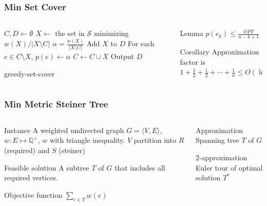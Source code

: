 \documentclass[12pt,aspectratio=169]{beamer}
\begin{document}
\begin{frame}\frametitle{Min Set Cover }
\begin{columns} 
  \begin{column}{0.61\textwidth}
\begin{algorithm}[H]
  $C, D\gets \emptyset$\;
{
  $X\gets$ the set in $\mathcal{S}$ minimizing $w(X)/|X\setminus C|$\;
  $\alpha = \frac{w(X)}{|X\setminus C|}$\;
  Add $X$ to $D$\;
  For each $e\in C\setminus X$, $p(e)\gets \alpha$\;
  $C\gets C\cup X$
}
Output $D$
\caption{greedy-set-cover}
\end{algorithm}
\end{column}
  \begin{column}{0.34\textwidth}
\begin{block}{Lemma}
    $p(e_{k}) \le \frac{OPT}{n-k+1}$
  \end{block}
  \begin{block}{Corollary}
    Approximation factor is $1 + \frac{1}{2} + \frac{1}{2} + \cdots + \frac{1}{n} \le
    O(\log n)$
  \end{block}
\end{column}
\end{columns}
\end{frame}

\begin{frame}\frametitle{Min Metric Steiner Tree}
\begin{columns} 
  \begin{column}{0.48\textwidth}
  \begin{block}{Instance}
    A weighted undirected graph $G=\langle V,E \rangle$, $w:E\mapsto \mathbb{Q}^{+}$, $w$
    with triangle inequality.
%
    $V$ partition into $R$ (required) and $S$ (steiner)
  \end{block}
  \begin{block}{Feasible solution}
    A subtree $T$ of $G$ that includes all required vertices.
%
  \end{block}
  \begin{block}{Objective function}
    $\sum_{e\in T}w(e)$
  \end{block}
\end{column}
    \begin{column}{0.48\textwidth}
      \begin{block}{Approximation}
        Spanning tree $T$ of $G$
      \end{block}
      \begin{block}{2-approximation}
Euler tour of optimal solution $T^{*}$
      \end{block}
    \end{column}
\end{columns}
\end{frame}
\end{document}
